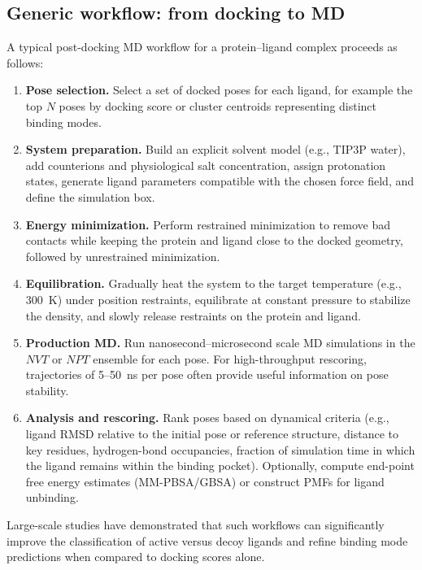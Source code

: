 \documentclass[12pt,a4paper]{article}
\begin{document}
\subsection{Generic workflow: from docking to MD}

A typical post-docking MD workflow for a protein--ligand complex proceeds as follows:

\begin{enumerate}
\item \textbf{Pose selection.} Select a set of docked poses for each ligand, for example the top \(N\) poses by docking score or cluster centroids representing distinct binding modes.

\item \textbf{System preparation.} Build an explicit solvent model (e.g., TIP3P water), add counterions and physiological salt concentration, assign protonation states, generate ligand parameters compatible with the chosen force field, and define the simulation box.

\item \textbf{Energy minimization.} Perform restrained minimization to remove bad contacts while keeping the protein and ligand close to the docked geometry, followed by unrestrained minimization.

\item \textbf{Equilibration.} Gradually heat the system to the target temperature (e.g., 300~K) under position restraints, equilibrate at constant pressure to stabilize the density, and slowly release restraints on the protein and ligand.

\item \textbf{Production MD.} Run nanosecond--microsecond scale MD simulations in the \(NVT\) or \(NPT\) ensemble for each pose. For high-throughput rescoring, trajectories of 5--50~ns per pose often provide useful information on pose stability.

\item \textbf{Analysis and rescoring.} Rank poses based on dynamical criteria (e.g., ligand RMSD relative to the initial pose or reference structure, distance to key residues, hydrogen-bond occupancies, fraction of simulation time in which the ligand remains within the binding pocket). Optionally, compute end-point free energy estimates (MM-PBSA/GBSA) or construct PMFs for ligand unbinding.
\end{enumerate}

Large-scale studies have demonstrated that such workflows can significantly improve the classification of active versus decoy ligands and refine binding mode predictions when compared to docking scores alone.\cite{Cournia2017,Khuttan2020}
\end{document}
